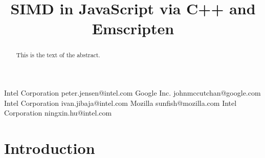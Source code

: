 \documentclass[preprint]{sigplanconf}
\begin{document}
\setlength{\pdfpageheight}{\paperheight}
\setlength{\pdfpagewidth}{\paperwidth}






\title{SIMD in JavaScript via C++ and Emscripten}

           {Intel Corporation}
           {peter.jensen@intel.com}
           {Google Inc.}
           {johnmccutchan@google.com}
           {Intel Corporation}
           {ivan.jibaja@intel.com}
           {Mozilla}
           {sunfish@mozilla.com}
           {Intel Corporation}
           {ningxin.hu@intel.com}

\maketitle

\begin{abstract}
This is the text of the abstract.
\end{abstract}




\section{Introduction}
\end{document}
